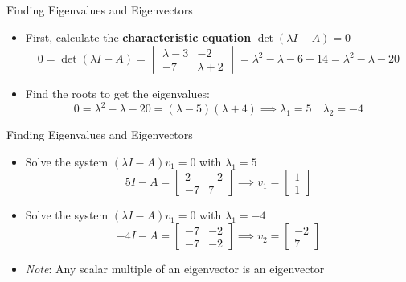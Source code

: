 \documentclass[10pt]{beamer}
\begin{document}
\begin{frame}{Finding Eigenvalues and Eigenvectors}

\begin{itemize}
   
\begin{example}
Find the eigenvalues and eigenvectors of $ \displaystyle A = \begin{bmatrix} \phantom{-}3 & \phantom{-}2 \\ \phantom{-}7&-2 \end{bmatrix}$
\end{example}

\item First, calculate the \textbf{characteristic equation} $ \det(\lambda I - A)=0$\\
$$
0 = \det(\lambda I-A) = \begin{vmatrix}
    \lambda - 3 & -2\\
    -7 & \lambda+2
\end{vmatrix} = \lambda^2 -\lambda -6 -14 =\lambda^2-\lambda - 20
$$
\item  Find the roots to get the eigenvalues:
$$
0  =\lambda^2-\lambda - 20 = (\lambda-5)(\lambda+4) \implies \lambda_1 = 5 \quad \lambda_2 = -4
$$

  \end{itemize}
\end{frame}

\begin{frame}{Finding Eigenvalues and Eigenvectors}

\begin{itemize}
   
\item Solve the system $(\lambda I-A)v_1=0$ with $\lambda_1=5$
$$
5 I - A= 
\begin{bmatrix}
    2 & -2 \\
    -7 & 7
\end{bmatrix} \implies v_1 = \begin{bmatrix}
    1\\1
\end{bmatrix}
$$

\item Solve the system $(\lambda I-A)v_1=0$ with $\lambda_1=-4$
$$
-4 I - A= 
\begin{bmatrix}
    -7 & -2 \\
    -7 & -2
\end{bmatrix} \implies v_2 = \begin{bmatrix}
    -2\\7
\end{bmatrix}
$$
\item \textit{Note}: Any scalar multiple of an eigenvector is an eigenvector

  \end{itemize}
\end{frame}
\end{document}
